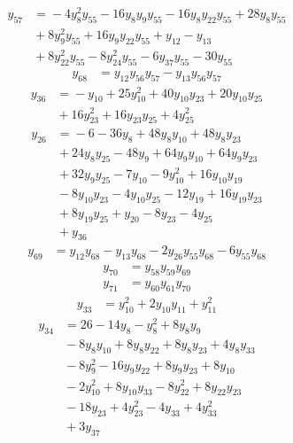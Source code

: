 \begin{align*}
y_{57} &={} -4y_{8}^{2}y_{55} -16y_{8}y_{9}y_{55} -16y_{8}y_{22}y_{55} +28y_{8}y_{55} \\
 &{} +8y_{9}^{2}y_{55} +16y_{9}y_{22}y_{55} +y_{12} -y_{13} \\
 &{} +8y_{22}^{2}y_{55} -8y_{24}^{2}y_{55} -6y_{37}y_{55} -30y_{55}
\end{align*}
\begin{align*}
y_{68} &={} y_{12}y_{56}y_{57} -y_{13}y_{56}y_{57}
\end{align*}
\begin{align*}
y_{36} &={} -y_{10} +25y_{10}^{2} +40y_{10}y_{23} +20y_{10}y_{25} \\
 &{} +16y_{23}^{2} +16y_{23}y_{25} +4y_{25}^{2}
\end{align*}
\begin{align*}
y_{26} &={} -6 -36y_{8} +48y_{8}y_{10} +48y_{8}y_{23} \\
 &{} +24y_{8}y_{25} -48y_{9} +64y_{9}y_{10} +64y_{9}y_{23} \\
 &{} +32y_{9}y_{25} -7y_{10} -9y_{10}^{2} +16y_{10}y_{19} \\
 &{} -8y_{10}y_{23} -4y_{10}y_{25} -12y_{19} +16y_{19}y_{23} \\
 &{} +8y_{19}y_{25} +y_{20} -8y_{23} -4y_{25} \\
 &{} +y_{36}
\end{align*}
\begin{align*}
y_{69} &={} y_{12}y_{68} -y_{13}y_{68} -2y_{26}y_{55}y_{68} -6y_{55}y_{68}
\end{align*}
\begin{align*}
y_{70} &={} y_{58}y_{59}y_{69}
\end{align*}
\begin{align*}
y_{71} &={} y_{60}y_{61}y_{70}
\end{align*}
\begin{align*}
y_{33} &={} y_{10}^{2} +2y_{10}y_{11} +y_{11}^{2}
\end{align*}
\begin{align*}
y_{34} &={} 26 -14y_{8} -y_{8}^{2} +8y_{8}y_{9} \\
 &{} -8y_{8}y_{10} +8y_{8}y_{22} +8y_{8}y_{23} +4y_{8}y_{33} \\
 &{} -8y_{9}^{2} -16y_{9}y_{22} +8y_{9}y_{23} +8y_{10} \\
 &{} -2y_{10}^{2} +8y_{10}y_{33} -8y_{22}^{2} +8y_{22}y_{23} \\
 &{} -18y_{23} +4y_{23}^{2} -4y_{33} +4y_{33}^{2} \\
 &{} +3y_{37}
\end{align*}
